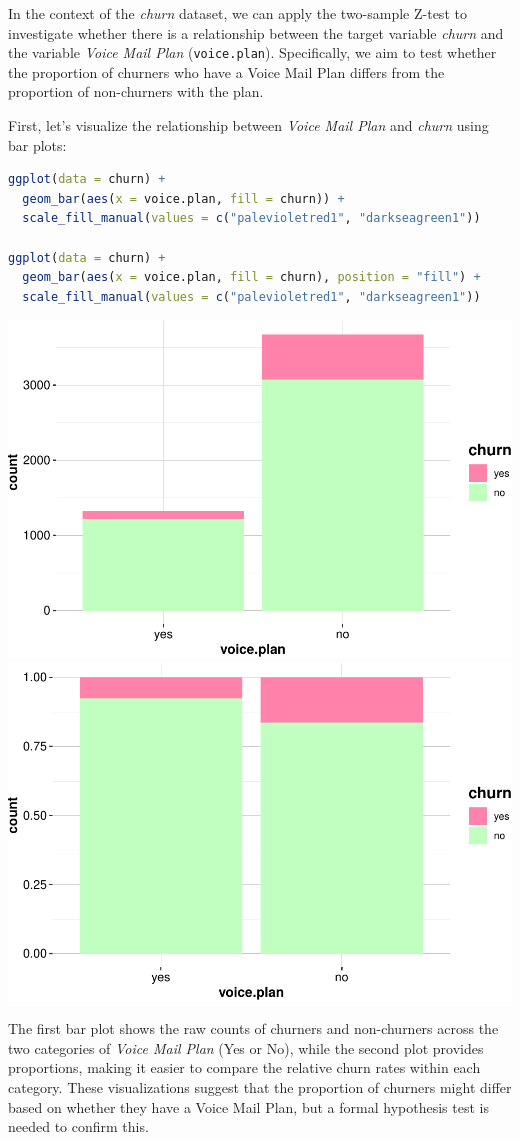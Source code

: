 \documentclass[
]{book}
\newcommand{\passthrough}[1]{#1}
\theoremstyle{definition}
\theoremstyle{definition}
\theoremstyle{definition}
\theoremstyle{definition}
\theoremstyle{remark}
\begin{document}
In the context of the \emph{churn} dataset, we can apply the two-sample Z-test to investigate whether there is a relationship between the target variable \emph{churn} and the variable \emph{Voice Mail Plan} (\passthrough{\lstinline!voice.plan!}). Specifically, we aim to test whether the proportion of churners who have a Voice Mail Plan differs from the proportion of non-churners with the plan.

First, let's visualize the relationship between \emph{Voice Mail Plan} and \emph{churn} using bar plots:

\begin{lstlisting}[language=R]
ggplot(data = churn) + 
  geom_bar(aes(x = voice.plan, fill = churn)) +
  scale_fill_manual(values = c("palevioletred1", "darkseagreen1")) 

ggplot(data = churn) + 
  geom_bar(aes(x = voice.plan, fill = churn), position = "fill") +
  scale_fill_manual(values = c("palevioletred1", "darkseagreen1")) 
\end{lstlisting}

\includegraphics[width=0.5\linewidth]{statistics_files/figure-latex/unnamed-chunk-11-1} \includegraphics[width=0.5\linewidth]{statistics_files/figure-latex/unnamed-chunk-11-2}

The first bar plot shows the raw counts of churners and non-churners across the two categories of \emph{Voice Mail Plan} (Yes or No), while the second plot provides proportions, making it easier to compare the relative churn rates within each category. These visualizations suggest that the proportion of churners might differ based on whether they have a Voice Mail Plan, but a formal hypothesis test is needed to confirm this.
\end{document}
